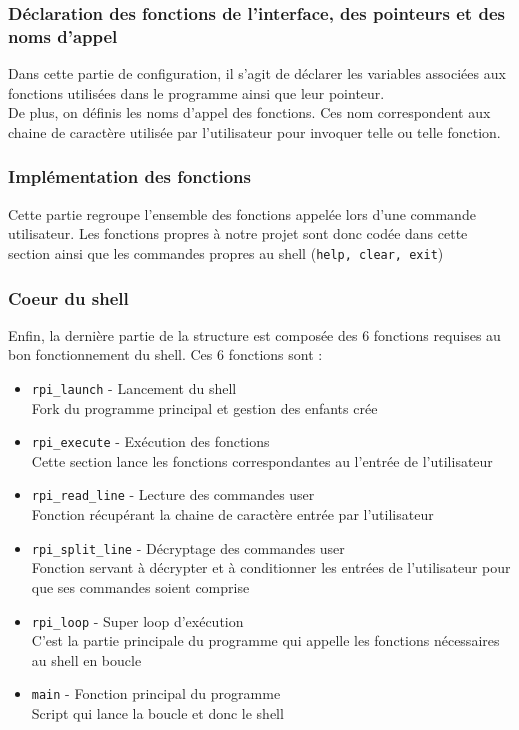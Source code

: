 \documentclass[10pt,a4paper]{article}
\begin{document}
\subsubsection{Déclaration des fonctions de l'interface, des pointeurs et des noms d'appel}
Dans cette partie de configuration, il s'agit de déclarer les variables associées aux fonctions utilisées dans le programme ainsi que leur pointeur.\\

De plus, on définis les noms d'appel des fonctions. Ces nom correspondent aux chaine de caractère utilisée par l'utilisateur pour invoquer telle ou telle fonction.

\subsubsection{Implémentation des fonctions}
Cette partie regroupe l'ensemble des fonctions appelée lors d'une commande utilisateur. Les fonctions propres à notre projet sont donc codée dans cette section ainsi que les commandes propres au shell (\texttt{help, clear, exit})

\subsubsection{Coeur du shell}
Enfin, la dernière partie de la structure est composée des 6 fonctions requises au bon fonctionnement du shell. Ces 6 fonctions sont : 
\begin{itemize}
\item \texttt{rpi\_launch} - Lancement du shell\\
Fork du programme principal et gestion des enfants crée

\item \texttt{rpi\_execute} - Exécution des fonctions\\
Cette section lance les fonctions correspondantes au l'entrée de l'utilisateur

\item \texttt{rpi\_read\_line} - Lecture des commandes user\\
Fonction récupérant la chaine de caractère entrée par l'utilisateur

\item \texttt{rpi\_split\_line} - Décryptage des commandes user\\
Fonction servant à décrypter et à conditionner les entrées de l'utilisateur pour que ses commandes soient comprise

\item \texttt{rpi\_loop} - Super loop d'exécution\\
C'est la partie principale du programme qui appelle les fonctions nécessaires au shell en boucle

\item \texttt{main} - Fonction principal du programme\\
Script qui lance la boucle et donc le shell 
\end{itemize}
\end{document}
